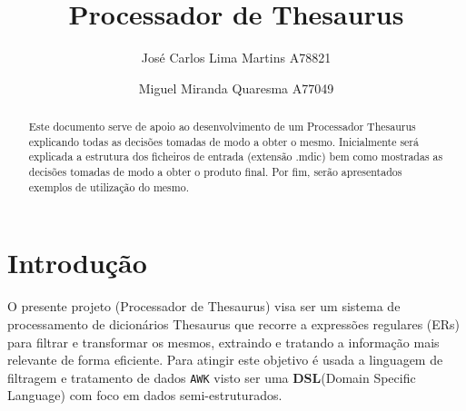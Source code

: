\documentclass{llncs}
\begin{document}
 \mainmatter
\title{Processador de Thesaurus}
\author{José Carlos Lima Martins A78821 \and
        Miguel Miranda Quaresma A77049}

\maketitle

\justify

\begin{abstract}
Este documento serve de apoio ao desenvolvimento de um Processador Thesaurus explicando todas as decisões tomadas de modo a obter o mesmo. Inicialmente será explicada a estrutura dos ficheiros de entrada (extensão .mdic) bem como mostradas as decisões tomadas de modo a obter o produto final. Por fim, serão apresentados exemplos de utilização do mesmo.
\end{abstract}

\section{Introdução}
O presente projeto (Processador de Thesaurus) visa ser um sistema de processamento de dicionários Thesaurus que recorre a expressões regulares (ERs) para filtrar e transformar os mesmos, extraindo e tratando a informação mais relevante de forma eficiente. Para atingir este objetivo é usada a linguagem de filtragem e tratamento de dados \texttt{AWK} visto ser uma \textbf{DSL}(Domain Specific Language) com foco em dados semi-estruturados.
\end{document}
